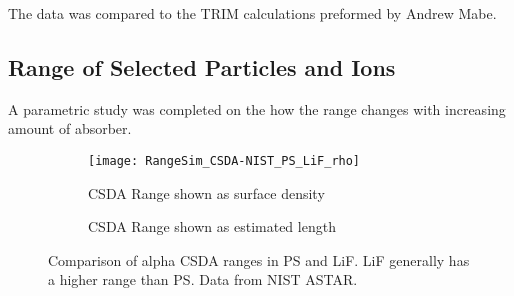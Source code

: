 \documentclass[draftcls,onecolumn]{IEEEtran}
\begin{document}
The data was compared to the TRIM calculations preformed by Andrew Mabe.
\subsection{Range of Selected Particles and Ions}
\label{sec:RangeResults}

A parametric study was completed on the how the range changes with increasing amount of absorber.

\begin{figure}
  \centering
  \begin{subfigure}{0.45\textwidth}
    \texttt{[image: RangeSim\_CSDA-NIST\_PS\_LiF\_rho]}
    \caption{CSDA Range shown as surface density}
    \label{fig:NISTPSLiF_rho}
  \end{subfigure}%
  \begin{subfigure}
    \texttt{[image: RangeSim\_CSDA-NIST\_PS\_LiF\_um]}
    \caption{CSDA Range shown as estimated length}
    \label{fig:NISTPSLiF_um}
  \end{subfigure}
  \caption[Comparison of alpha ranges in LiF and PS]{Comparison of alpha CSDA ranges in PS and LiF. LiF generally has a higher range than PS. Data from NIST ASTAR\cite{berger_estar_2005}.} 
  \label{fig:NISTPSLiF}
\end{figure}
\end{document}
